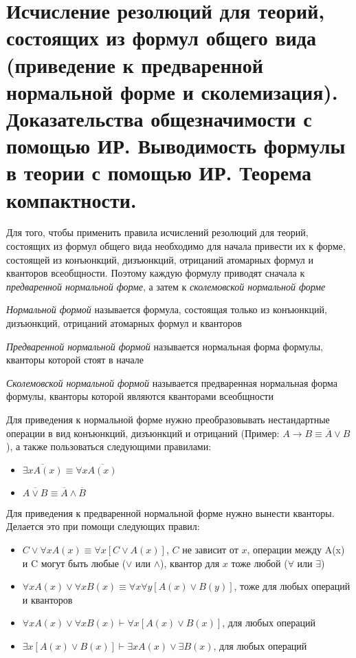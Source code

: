 \documentclass{article}
\begin{document}
\section{Исчисление резолюций для теорий, состоящих из формул общего вида (приведение к предваренной нормальной форме и сколемизация). Доказательства общезначимости с помощью ИР. Выводимость формулы в теории с помощью ИР. Теорема компактности.}
Для того, чтобы применить правила исчислений резолюций для теорий, состоящих из формул общего вида необходимо для начала привести их к форме, состоящей из конъюнкций, дизъюнкций, отрицаний атомарных формул и кванторов всеобщности. Поэтому каждую формулу приводят сначала к \textit{предваренной нормальной форме}, а затем к \textit{сколемовской нормальной форме}

\begin{definition}
	\textit{Нормальной формой} называется формула, состоящая только из конъюнкций, дизъюнкций, отрицаний атомарных формул и кванторов
\end{definition}

\begin{definition}
	\textit{Предваренной нормальной формой} называется нормальная форма формулы, кванторы которой стоят в начале
\end{definition}

\begin{definition}
	\textit{Сколемовской нормальной формой} называется предваренная нормальная форма формулы, кванторы которой являются кванторами всеобщности
\end{definition}

Для приведения к нормальной форме нужно преобразовывать нестандартные операции в вид конъюнкций, дизъюнкций и отрицаний (Пример: \(A \rightarrow B \equiv \overline{A} \vee B\)), а также пользоваться следующими правилами:
\begin{itemize}
	\item \(\overline{\exists x A(x)} \equiv \forall x\overline{A(x)}\)
	\item \(\overline{A \vee B} \equiv \overline{A} \wedge \overline{B}\)
\end{itemize}

Для приведения к предваренной нормальной форме нужно вынести кванторы. Делается это при помощи следующих правил:
\begin{itemize}
	\item \(C \vee \forall x A(x) \equiv \forall x[C \vee A(x)]\), \(C\) не зависит от \(x\), операции между A(x) и C могут быть любые (\(\vee\) или \(\wedge\)), квантор для \(x\) тоже любой (\(\forall\) или \(\exists\))
	\item \(\forall x A(x) \vee \forall x B(x) \equiv \forall x\forall y[A(x) \vee B(y)]\), тоже для любых операций и кванторов
	\item \(\forall x A(x) \vee \forall x B(x) \vdash \forall x[A(x) \vee B(x)]\), для любых операций
	\item \(\exists x[A(x) \vee B(x)] \vdash \exists x A(x) \vee \exists B(x)\), для любых операций
\end{itemize}
\end{document}

